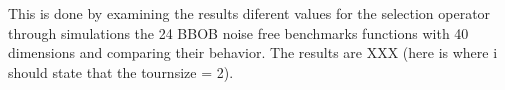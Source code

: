  This is done by examining the results diferent values for the selection operator through simulations the 24 BBOB noise free benchmarks functions with 40 dimensions and comparing their behavior. The results are XXX (here is where i should state that the tournsize = 2).